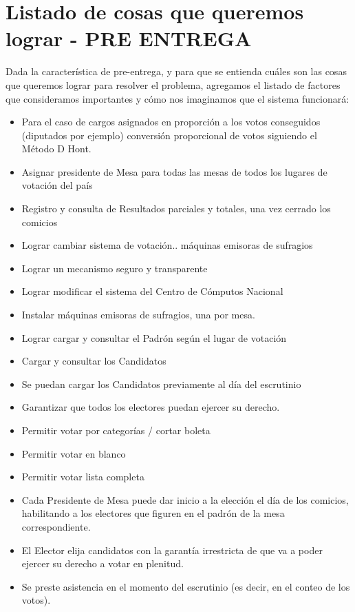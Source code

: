 \documentclass[spanish, 10pt,a4paper]{article}
\numberwithin{equation}{section} %
\begin{document}
\newpage
\section{Listado de cosas que queremos lograr - PRE ENTREGA}

Dada la característica de pre-entrega, y para que se entienda cuáles son las cosas que queremos lograr para resolver el problema, agregamos el listado de factores que consideramos importantes y cómo nos imaginamos que el sistema funcionará: 

\begin{itemize}
\item Para el caso de cargos asignados en proporción a los votos conseguidos (diputados por ejemplo) conversión proporcional de votos siguiendo el Método D Hont.
\item Asignar presidente de Mesa para todas las mesas de todos los lugares de votación del país
\item Registro y consulta de Resultados parciales y totales, una vez cerrado los comicios
\item Lograr cambiar sistema de votación.. máquinas emisoras de sufragios
\item Lograr un mecanismo seguro y transparente
\item Lograr modificar el sistema del Centro de Cómputos Nacional
\item Instalar máquinas emisoras de sufragios, una por mesa.
\item Lograr cargar y consultar el Padrón según el lugar de votación
\item Cargar y consultar los Candidatos
\item Se puedan cargar los Candidatos previamente al día del escrutinio
\item Garantizar que todos los electores puedan ejercer su derecho.
\item Permitir votar por categorías  / cortar boleta
\item Permitir votar en blanco
\item Permitir votar lista completa
\item Cada Presidente de Mesa puede dar inicio a la elección el día de los comicios, habilitando a los electores que figuren en el padrón de la mesa correspondiente.
\item El Elector elija candidatos con la garantía irrestricta de que va a poder ejercer su derecho a votar en plenitud.
\item Se preste asistencia en el momento del escrutinio (es decir, en el conteo de los votos).

\end{itemize}
\end{document}
